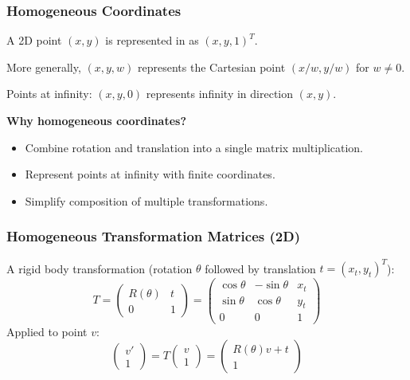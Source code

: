 \separator

\subsubsection{Homogeneous Coordinates}

\begin{defbox}
A 2D point $(x, y)$ is represented in  as $(x, y, 1)^T$.

More generally, $(x, y, w)$ represents the Cartesian point $(x/w, y/w)$ for $w \neq 0$.

Points at infinity: $(x, y, 0)$ represents infinity in direction $(x, y)$.
\end{defbox}

\textbf{Why homogeneous coordinates?}
\begin{itemize}
  \item Combine rotation and translation into a single matrix multiplication.
  \item Represent points at infinity with finite coordinates.
  \item Simplify composition of multiple transformations.
\end{itemize}

\separator

\subsubsection{Homogeneous Transformation Matrices (2D)}

\begin{defbox}
A rigid body transformation (rotation $\theta$ followed by translation $t = (x_t, y_t)^T$):
\[
T = \begin{pmatrix} R(\theta) & t \\ 0 & 1 \end{pmatrix} = \begin{pmatrix} \cos\theta & -\sin\theta & x_t \\ \sin\theta & \cos\theta & y_t \\ 0 & 0 & 1 \end{pmatrix}
\]
Applied to point $v$:
\[
\begin{pmatrix} v' \\ 1 \end{pmatrix} = T \begin{pmatrix} v \\ 1 \end{pmatrix} = \begin{pmatrix} R(\theta) v + t \\ 1 \end{pmatrix}
\]
\end{defbox}


